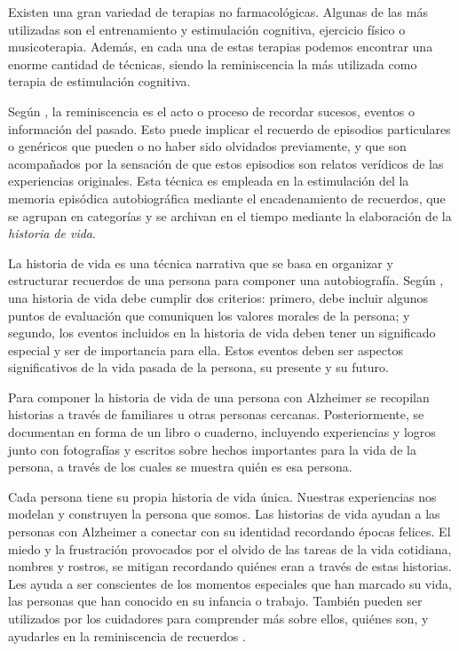 Existen una gran variedad de terapias no farmacológicas. Algunas de las más utilizadas son el entrenamiento y estimulación cognitiva, ejercicio físico o musicoterapia. Además, en cada una de estas terapias podemos encontrar una enorme cantidad de técnicas, siendo la reminiscencia la más utilizada como terapia de estimulación cognitiva.

Según \cite{o2013cross}, la reminiscencia es el acto o proceso de recordar sucesos, eventos o información del pasado. Esto puede implicar el recuerdo de episodios particulares o genéricos que pueden o no haber sido olvidados previamente, y que son acompañados por la sensación de que estos episodios son relatos verídicos de las experiencias originales. Esta técnica es empleada en la estimulación del la memoria episódica autobiográfica mediante el encadenamiento de recuerdos, que se agrupan en categorías y se archivan en el tiempo mediante la elaboración de la \textit{historia de vida}.

La historia de vida es una técnica narrativa que se basa en organizar y estructurar recuerdos de una persona para componer una autobiografía. Según \cite{linde1993life}, una historia de vida debe cumplir dos criterios: primero, debe incluir algunos puntos de evaluación que comuniquen los valores morales de la persona; y segundo, los eventos incluidos en la historia de vida deben tener un significado especial y ser de importancia para ella. Estos eventos deben ser aspectos significativos de la vida pasada de la persona, su presente y su futuro.

Para componer la historia de vida de una persona con Alzheimer se recopilan historias a través de familiares u otras personas cercanas. Posteriormente, se documentan en forma de un libro o cuaderno, incluyendo experiencias y logros junto con fotografías y escritos sobre hechos importantes para la vida de la persona, a través de los cuales se muestra quién es esa persona.

Cada persona tiene su propia historia de vida única. Nuestras experiencias nos modelan y construyen la persona que somos. Las historias de vida ayudan a las personas con Alzheimer a conectar con su identidad recordando épocas felices. El miedo y la frustración provocados por el olvido de las tareas de la vida cotidiana, nombres y rostros, se mitigan recordando quiénes eran a través de estas historias. Les ayuda a ser conscientes de los momentos especiales que han marcado su vida, las personas que han conocido en su infancia o trabajo. También pueden ser utilizados por los cuidadores para comprender más sobre ellos, quiénes son, y ayudarles en la reminiscencia de recuerdos \citep{karlsson2014stories}.


